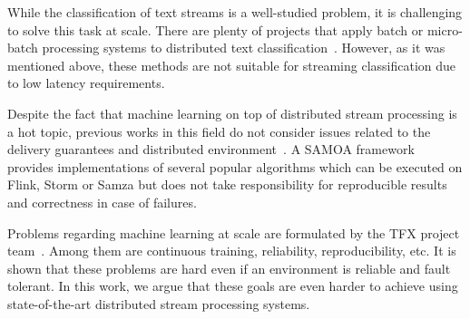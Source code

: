 \label{fs-related}

While the classification of text streams is a well-studied problem, it is challenging to solve this task at scale. There are plenty of projects that apply batch or micro-batch processing systems to distributed text classification~\cite{semberecki2016distributed, 8029336, baltas2016apache, svyatkovskiy2016large, Nodarakis2016LargeSS}. However, as it was mentioned above, these methods are not suitable for streaming classification due to low latency requirements. 

Despite the fact that machine learning on top of distributed stream processing is a hot topic, previous works in this field do not consider issues related to the delivery guarantees and distributed environment~\cite{khumoyun2016real}. A SAMOA framework~\cite{morales2015samoa} provides implementations of several popular algorithms which can be executed on Flink, Storm or Samza but does not take responsibility for reproducible results and correctness in case of failures.

Problems regarding machine learning at scale are formulated by the TFX project team~\cite{Baylor:2017:TTP:3097983.3098021}. Among them are continuous training, reliability, reproducibility, etc. It is shown that these problems are hard even if an environment is reliable and fault tolerant. In this work, we argue that these goals are even harder to achieve using state-of-the-art distributed stream processing systems.